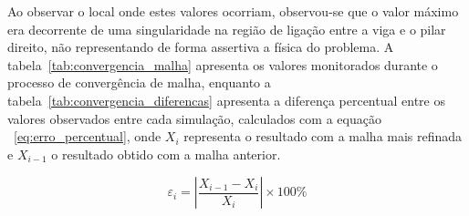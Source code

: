\documentclass[a4paper, 12pt]{article}
\begin{document}
Ao observar o local onde estes valores ocorriam, observou-se que o valor máximo era decorrente de uma singularidade na região de ligação entre a viga e o pilar direito, não representando de forma assertiva a física do problema. A tabela~\ref{tab:convergencia_malha} apresenta os valores monitorados durante o processo de convergência de malha, enquanto a tabela~\ref{tab:convergencia_diferencas} apresenta a diferença percentual entre os valores observados entre cada simulação, calculados com a equação ~\ref{eq:erro_percentual}, onde $X_{i}$ representa o resultado com a malha mais refinada e $X_{i-1}$ o resultado obtido com a malha anterior.

\begin{equation}
    \varepsilon_i =
    \left|
    \frac{X_{i-1} - X_i}{X_i}
    \right| \times 100\%
    \label{eq:erro_percentual}
\end{equation}
\end{document}
